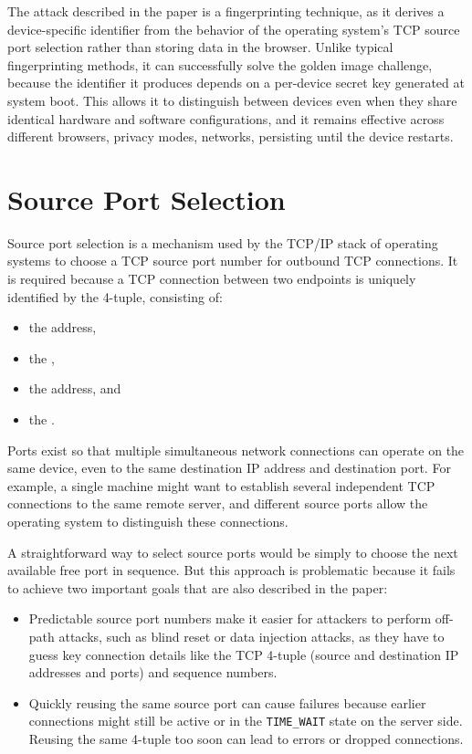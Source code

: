 \documentclass{report}
\begin{document}
The attack described in the paper is a \alert{fingerprinting technique}, as it derives a device-specific identifier from the behavior of the operating system’s TCP source port selection rather than storing data in the browser. Unlike typical fingerprinting methods, it can successfully solve the \alert{golden image challenge}, because the identifier it produces depends on a per-device secret key generated at system boot. This allows it to distinguish between devices even when they share identical hardware and software configurations, and it remains effective across different browsers, privacy modes, networks, persisting until the device restarts.

\section{Source Port Selection}
\label{sec:source port selection}

Source port selection is a mechanism used by the TCP/IP stack of operating systems to choose a TCP source port number for outbound TCP connections. It is required because a TCP connection between two endpoints is uniquely identified by the \alert{4-tuple}, consisting of:
\begin{itemize}
	\item the  address,
	\item the ,
	\item the  address, and
	\item the .
\end{itemize}

\alert{Ports} exist so that multiple simultaneous network connections can operate on the same device, even to the same destination IP address and destination port. For example, a single machine might want to establish several independent TCP connections to the same remote server, and different source ports allow the operating system to distinguish these connections.

A straightforward way to select source ports would be simply to choose the next available free port in sequence. But this approach is problematic because it fails to achieve two important goals that are also described in the paper:

\begin{itemize}
	\item {} Predictable source port numbers make it easier for attackers to perform off-path attacks, such as blind reset or data injection attacks, as they have to guess key connection details like the TCP 4-tuple (source and destination IP addresses and ports) and sequence numbers.
	\item {} Quickly reusing the same source port can cause failures because earlier connections might still be active or in the \texttt{TIME\_WAIT} state on the server side. Reusing the same 4-tuple too soon can lead to errors or dropped connections.
\end{itemize}
\end{document}

